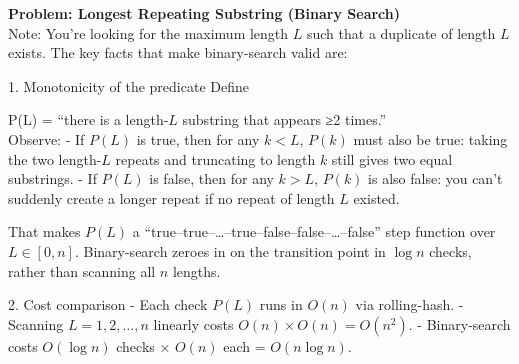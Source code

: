 \noindent\textbf{Problem: Longest Repeating Substring (Binary Search)} 
\\ 

Note: You’re looking for the maximum length \(L\) such that a duplicate of length \(L\) exists. The key facts that make binary-search valid are:

1.  Monotonicity of the predicate  
    Define  

      P(L) = “there is a length-\(L\) substring that appears ≥2 times.”
    \\
    Observe:
    -  If \(P(L)\) is true, then for any \(k < L\), \(P(k)\) must also be true: taking the two length-\(L\) repeats and truncating to length \(k\) still gives two equal substrings.
    -  If \(P(L)\) is false, then for any \(k > L\), \(P(k)\) is also false: you can’t suddenly create a longer repeat if no repeat of length \(L\) existed.

    That makes \(P(L)\) a “true–true–…–true–false–false–…–false” step function over \(L\in[0,n]\). Binary-search zeroes in on the transition point in \(\log n\) checks, rather than scanning all \(n\) lengths.

2.  Cost comparison  
    -  Each check \(P(L)\) runs in \(O(n)\) via rolling-hash.  
    -  Scanning \(L=1,2,\dots,n\) linearly costs \(O(n)\times O(n)=O(n^2)\).  
    -  Binary-search costs \(O(\log n)\) checks × \(O(n)\) each = \(O(n\log n)\).



